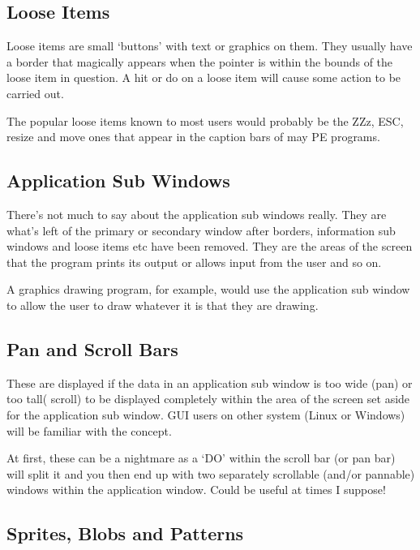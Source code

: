 \subsection{Loose Items}
\label{ch22-loose}%

Loose items are small `buttons' with text or graphics on them.
      They usually have a border that magically appears when the pointer is
      within the bounds of the loose item in question. A hit or do on a loose
      item will cause some action to be carried out.

The popular loose items known to most users would probably be the
      ZZz, ESC, resize and move ones that appear in the caption bars of may
      PE programs.

\subsection{Application Sub Windows}
\label{ch22-app-sub-win}%

There's not much to say about the application sub windows really.
      They are what's left of the primary or secondary window after borders,
      information sub windows and loose items etc have been removed. They are
      the areas of the screen that the program prints its output or allows
      input from the user and so on.

A graphics drawing program, for example, would use the application
      sub window to allow the user to draw whatever it is that they are
      drawing.

\subsection{Pan and Scroll Bars}
\label{ch22-pan-scroll}%

These are displayed if the data in an application sub window is
      too wide (pan) or too tall( scroll) to be displayed completely within
      the area of the screen set aside for the application sub window. GUI
      users on other system (Linux or Windows) will be familiar with the
      concept.

At first, these can be a nightmare as a `DO' within the scroll bar
      (or pan bar) will split it and you then end up with two separately
      scrollable (and/or pannable) windows within the application window.
      Could be useful at times I suppose!

\subsection{Sprites, Blobs and Patterns}
\label{ch22-sprites}%

